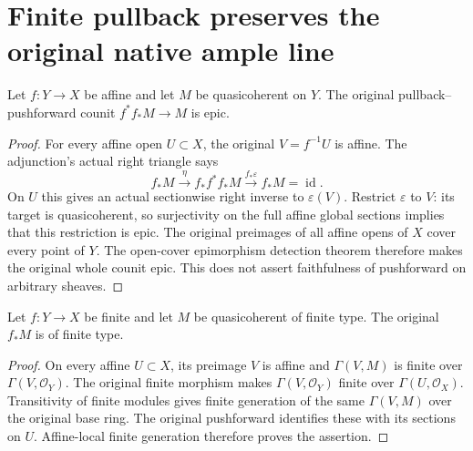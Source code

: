 \section{Finite pullback preserves the original native ample line}

\begin{lemma}
\label{lem:pl-auxiliary-affine-counit-epic}
\leanok
{}
Let $f:Y\to X$ be affine and let $M$ be quasicoherent on $Y$.
The original pullback--pushforward counit $f^*f_*M\to M$ is epic.
\end{lemma}
\begin{proof}
\leanok
For every affine open $U\subset X$, the original $V=f^{-1}U$ is
affine. The adjunction's actual right triangle says
\[
 f_*M\xrightarrow{\eta}f_*f^*f_*M
       \xrightarrow{f_*\varepsilon} f_*M=\operatorname{id}.
\]
On $U$ this gives an actual sectionwise right inverse to
$\varepsilon(V)$. Restrict $\varepsilon$ to $V$: its target is
quasicoherent, so surjectivity on the full affine global sections
implies that this restriction is epic. The original preimages of
all affine opens of $X$ cover every point of $Y$. The open-cover
epimorphism detection theorem therefore makes the original whole
counit epic. This does not assert faithfulness of pushforward on
arbitrary sheaves.
\end{proof}

\begin{lemma}
\label{lem:pl-auxiliary-finite-pushforward-finite-type}
\leanok
Let $f:Y\to X$ be finite and let $M$ be quasicoherent of finite
type. The original $f_*M$ is of finite type.
\end{lemma}
\begin{proof}
\leanok
On every affine $U\subset X$, its preimage $V$ is affine and
$\Gamma(V,M)$ is finite over $\Gamma(V,\mathcal O_Y)$. The
original finite morphism makes $\Gamma(V,\mathcal O_Y)$ finite
over $\Gamma(U,\mathcal O_X)$. Transitivity of finite modules gives
finite generation of the same $\Gamma(V,M)$ over the original
base ring. The original pushforward identifies these with its
sections on $U$. Affine-local finite generation therefore proves
the assertion.
\end{proof}

